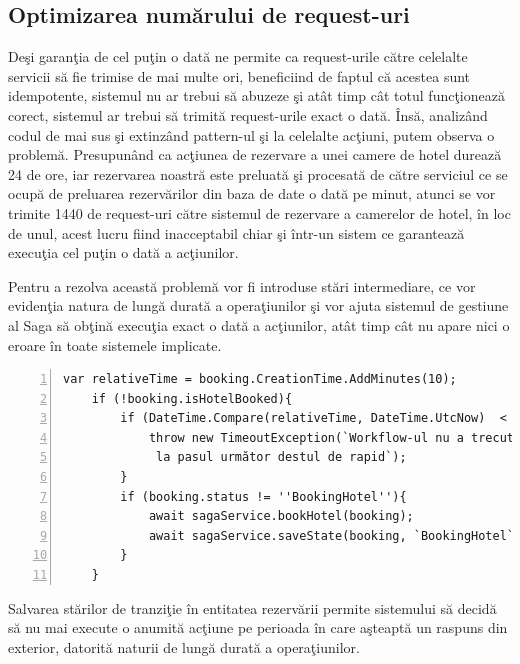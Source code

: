 \subsection{Optimizarea numărului de request-uri}
 \par Deşi garanţia de cel puţin o dată ne permite ca request-urile către celelalte servicii să fie trimise de mai multe ori, beneficiind de faptul că acestea sunt idempotente, sistemul nu ar trebui să abuzeze şi atât timp cât totul funcţionează corect, sistemul ar trebui să trimită request-urile exact o dată. Însă, analizând codul de mai sus şi extinzând pattern-ul şi la celelalte acţiuni, putem observa o problemă. Presupunând ca acţiunea de rezervare a unei camere de hotel durează 24 de ore, iar rezervarea noastră este preluată şi procesată de către serviciul ce se ocupă de preluarea rezervărilor din baza de date o dată pe minut, atunci se vor trimite 1440 de request-uri către sistemul de rezervare a camerelor de hotel, în loc de unul, acest lucru fiind inacceptabil chiar şi într-un sistem ce garantează execuţia cel puţin o dată a acţiunilor. 
 \par Pentru a rezolva această problemă vor fi introduse stări intermediare, ce vor evidenţia natura de lungă durată a operaţiunilor şi vor ajuta sistemul de gestiune al Saga să obţină execuţia exact o dată a acţiunilor, atât timp cât nu apare nici o eroare în toate sistemele implicate. 
 \begin{Verbatim}[numbers=left]
	var relativeTime = booking.CreationTime.AddMinutes(10);
	if (!booking.isHotelBooked){
		if (DateTime.Compare(relativeTime, DateTime.UtcNow)  < 0 ){
			throw new TimeoutException(`Workflow-ul nu a trecut
			 la pasul următor destul de rapid`);
		}
		if (booking.status != ''BookingHotel''){
			await sagaService.bookHotel(booking);
			await sagaService.saveState(booking, `BookingHotel`);
		}
	}
\end{Verbatim}
\par Salvarea stărilor de tranziţie în entitatea rezervării permite sistemului să decidă să nu mai execute o anumită acţiune pe perioada în care aşteaptă un raspuns din exterior, datorită naturii de lungă durată a operaţiunilor.
